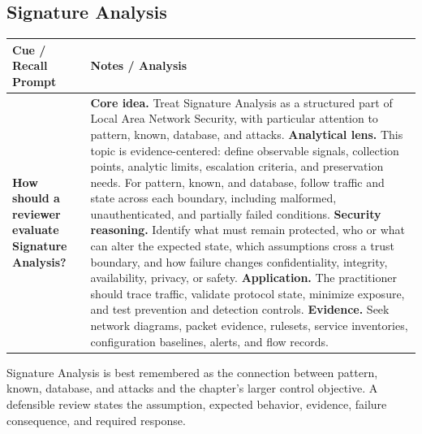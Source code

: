 \documentclass[11pt]{article}
\newcommand{\CornellHeader}{%
\rowcolor{Navy}\color{white}\bfseries Cue / Recall Prompt & \color{white}\bfseries Notes / Analysis\\\hline}
\newcommand{\CornellRow}[2]{%
\cellcolor{CueGray}\RaggedRight\textbf{#1} & \RaggedRight #2\\\hline}
\begin{document}
\subsection*{Signature Analysis}
\begin{longtable}{>{\RaggedRight\arraybackslash}p{}|>{\RaggedRight\arraybackslash}p{}}
\CornellHeader
\CornellRow{How should a reviewer evaluate Signature Analysis?}{\textbf{Core idea.} Treat Signature Analysis as a structured part of Local Area Network Security, with particular attention to pattern, known, database, and attacks. \textbf{Analytical lens.} This topic is evidence-centered: define observable signals, collection points, analytic limits, escalation criteria, and preservation needs. For pattern, known, and database, follow traffic and state across each boundary, including malformed, unauthenticated, and partially failed conditions. \textbf{Security reasoning.} Identify what must remain protected, who or what can alter the expected state, which assumptions cross a trust boundary, and how failure changes confidentiality, integrity, availability, privacy, or safety. \textbf{Application.} The practitioner should trace traffic, validate protocol state, minimize exposure, and test prevention and detection controls. \textbf{Evidence.} Seek network diagrams, packet evidence, rulesets, service inventories, configuration baselines, alerts, and flow records.}
\end{longtable}
\begin{topicsummary}
Signature Analysis is best remembered as the connection between pattern, known, database, and attacks and the chapter's larger control objective. A defensible review states the assumption, expected behavior, evidence, failure consequence, and required response.
\end{topicsummary}
\end{document}
